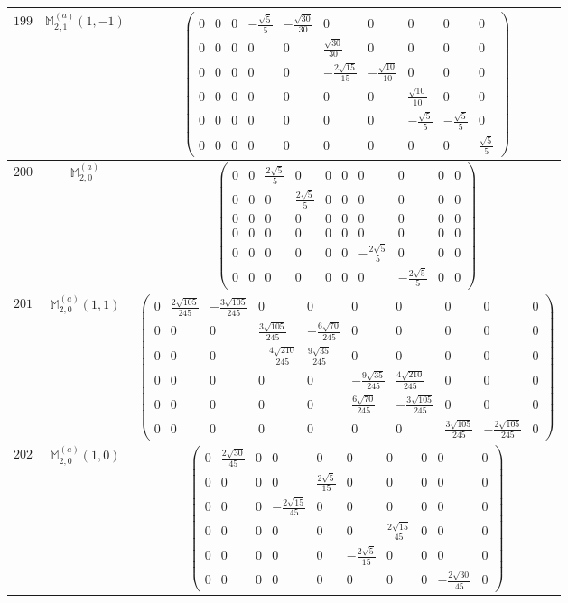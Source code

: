 \documentclass[fleqn,8pt,landscape]{jsarticle}
\begin{document}
\begin{center}
\begin{longtable}{ccc}
$ 199 $ & $ \mathbb{M}_{2,1}^{(a)}(1,-1) $ & $ \begin{pmatrix} 0 & 0 & 0 & - \frac{\sqrt{5}}{5} & - \frac{\sqrt{30}}{30} & 0 & 0 & 0 & 0 & 0 \\ 0 & 0 & 0 & 0 & 0 & \frac{\sqrt{30}}{30} & 0 & 0 & 0 & 0 \\ 0 & 0 & 0 & 0 & 0 & - \frac{2 \sqrt{15}}{15} & - \frac{\sqrt{10}}{10} & 0 & 0 & 0 \\ 0 & 0 & 0 & 0 & 0 & 0 & 0 & \frac{\sqrt{10}}{10} & 0 & 0 \\ 0 & 0 & 0 & 0 & 0 & 0 & 0 & - \frac{\sqrt{5}}{5} & - \frac{\sqrt{5}}{5} & 0 \\ 0 & 0 & 0 & 0 & 0 & 0 & 0 & 0 & 0 & \frac{\sqrt{5}}{5} \end{pmatrix} $ \\ \hline
$ 200 $ & $ \mathbb{M}_{2,0}^{(a)} $ & $ \begin{pmatrix} 0 & 0 & \frac{2 \sqrt{5}}{5} & 0 & 0 & 0 & 0 & 0 & 0 & 0 \\ 0 & 0 & 0 & \frac{2 \sqrt{5}}{5} & 0 & 0 & 0 & 0 & 0 & 0 \\ 0 & 0 & 0 & 0 & 0 & 0 & 0 & 0 & 0 & 0 \\ 0 & 0 & 0 & 0 & 0 & 0 & 0 & 0 & 0 & 0 \\ 0 & 0 & 0 & 0 & 0 & 0 & - \frac{2 \sqrt{5}}{5} & 0 & 0 & 0 \\ 0 & 0 & 0 & 0 & 0 & 0 & 0 & - \frac{2 \sqrt{5}}{5} & 0 & 0 \end{pmatrix} $ \\ \hline
$ 201 $ & $ \mathbb{M}_{2,0}^{(a)}(1,1) $ & $ \begin{pmatrix} 0 & \frac{2 \sqrt{105}}{245} & - \frac{3 \sqrt{105}}{245} & 0 & 0 & 0 & 0 & 0 & 0 & 0 \\ 0 & 0 & 0 & \frac{3 \sqrt{105}}{245} & - \frac{6 \sqrt{70}}{245} & 0 & 0 & 0 & 0 & 0 \\ 0 & 0 & 0 & - \frac{4 \sqrt{210}}{245} & \frac{9 \sqrt{35}}{245} & 0 & 0 & 0 & 0 & 0 \\ 0 & 0 & 0 & 0 & 0 & - \frac{9 \sqrt{35}}{245} & \frac{4 \sqrt{210}}{245} & 0 & 0 & 0 \\ 0 & 0 & 0 & 0 & 0 & \frac{6 \sqrt{70}}{245} & - \frac{3 \sqrt{105}}{245} & 0 & 0 & 0 \\ 0 & 0 & 0 & 0 & 0 & 0 & 0 & \frac{3 \sqrt{105}}{245} & - \frac{2 \sqrt{105}}{245} & 0 \end{pmatrix} $ \\ \hline
$ 202 $ & $ \mathbb{M}_{2,0}^{(a)}(1,0) $ & $ \begin{pmatrix} 0 & \frac{2 \sqrt{30}}{45} & 0 & 0 & 0 & 0 & 0 & 0 & 0 & 0 \\ 0 & 0 & 0 & 0 & \frac{2 \sqrt{5}}{15} & 0 & 0 & 0 & 0 & 0 \\ 0 & 0 & 0 & - \frac{2 \sqrt{15}}{45} & 0 & 0 & 0 & 0 & 0 & 0 \\ 0 & 0 & 0 & 0 & 0 & 0 & \frac{2 \sqrt{15}}{45} & 0 & 0 & 0 \\ 0 & 0 & 0 & 0 & 0 & - \frac{2 \sqrt{5}}{15} & 0 & 0 & 0 & 0 \\ 0 & 0 & 0 & 0 & 0 & 0 & 0 & 0 & - \frac{2 \sqrt{30}}{45} & 0 \end{pmatrix} $ \\ \hline

\end{longtable}
\end{center}
\end{document}
